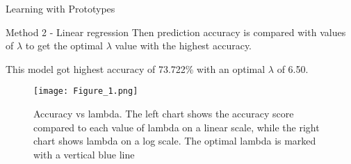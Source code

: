 \documentclass[a4paper,11pt]{article}
\begin{document}
\begin{mlsolution}
\begin{section}{Learning with Prototypes}
\begin{subsection}{Method 2 - Linear regression}
        Then prediction accuracy is compared with values of $\lambda$ to get the optimal $\lambda$ value with the highest accuracy.

        This model got highest accuracy of 73.722\% with an optimal $\lambda$ of 6.50.
        
        \begin{figure}[H]
            \centering
            \texttt{[image: Figure\_1.png]}
            \caption{Accuracy vs lambda. The left chart shows the accuracy score compared to each value of lambda on a linear scale, while the right chart shows lambda on a log scale. The optimal lambda is marked with a vertical blue line}
            \label{fig:acc-vs-lambda}
        \end{figure}
        \end{subsection}
    \end{section}
    


\end{mlsolution}
\end{document}
